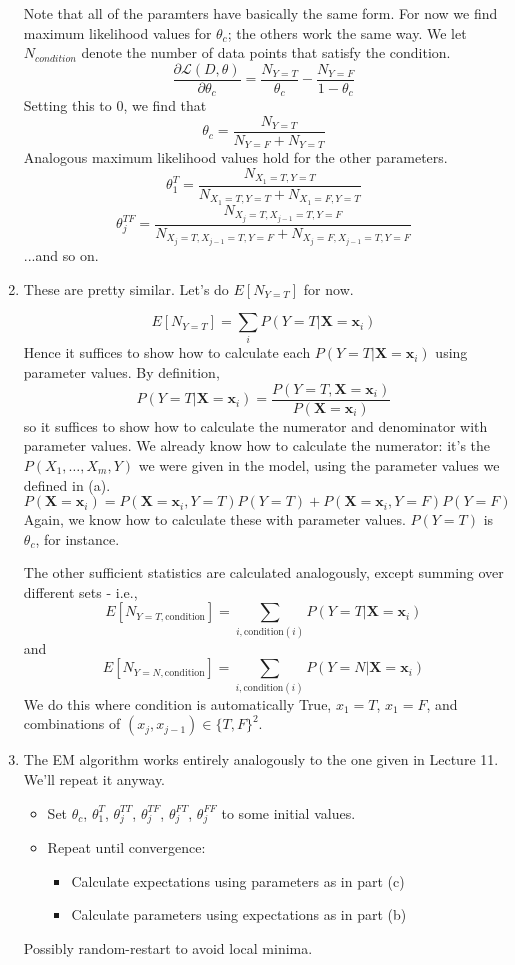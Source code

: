 \documentclass{article}
\newcommand{\dee}[2]{\frac{\partial{#1}}{\partial{#2}}}
\begin{document}
\begin{enumerate}
  Note that all of the paramters have basically the same form. For now
  we find maximum likelihood values for $\theta_c$; the others work the
  same way.  We let $N_{condition}$ denote the number of data points
  that satisfy the condition.
  $$\dee{\mathcal
    L(D,\theta)}{\theta_c}=\frac{N_{Y=T}}{\theta_c}-\frac{N_{Y=F}}{1-\theta_c}$$
  Setting this to 0, we find that
  $$\theta_c=\frac{N_{Y=T}}{N_{Y=F}+N_{Y=T}}$$
  Analogous maximum likelihood values hold for the other parameters.
  $$\theta_1^T=\frac{N_{X_1=T,Y=T}}{N_{X_1=T,Y=T}+N_{X_1=F,Y=T}}$$
  $$\theta_j^{TF}=\frac{N_{X_j=T,X_{j-1}=T,Y=F}}{N_{X_j=T,X_{j-1}=T,Y=F}+N_{X_j=F,X_{j-1}=T,Y=F}}$$
  ...and so on.
\item These are pretty similar. Let's do $E[N_{Y=T}]$ for now.

  $$E[N_{Y=T}]=\sum_i P(Y=T|\mathbf X = \mathbf x_i)$$ Hence it
  suffices to show how to calculate each $P(Y=T|\mathbf X=\mathbf
  x_i)$ using parameter values. By definition,
  \[P(Y=T|\mathbf X = \mathbf x_i)=\frac{P(Y=T, \mathbf X = \mathbf x_i)}{P(\mathbf X = \mathbf x_i)}\]
  so it suffices to show how to calculate the numerator and
  denominator with parameter values. We already know how to calculate
  the numerator: it's the $P(X_1,\ldots,X_m,Y)$ we were given in the
  model, using the parameter values we defined in (a).
  \[P(\mathbf X = \mathbf x_i)=P(\mathbf X = \mathbf x_i, Y=T)P(Y=T)+P(\mathbf X = \mathbf x_i, Y=F)P(Y=F)\]
  Again, we know how to calculate these with parameter
  values. $P(Y=T)$ is $\theta_c$, for instance.

  The other sufficient statistics are calculated analogously, except
  summing over different sets - i.e.,
  \[E[N_{Y=T,\mathrm{condition}}]=\sum_{i, \mathrm{condition}(i)} P(Y=T|\mathbf X=\mathbf x_i)\]
  and
  \[E[N_{Y=N,\mathrm{condition}}]=\sum_{i, \mathrm{condition}(i)} P(Y=N|\mathbf X=\mathbf x_i)\]
  We do this where condition is automatically True, $x_1=T$, $x_1=F$,
  and combinations of $(x_j,x_{j-1})\in \{T,F\}^2$.

\item The EM algorithm works entirely analogously to the one given in
  Lecture 11. We'll repeat it anyway.
  \begin{itemize}
  \item Set $\theta_c$, $\theta^T_1$, $\theta^{TT}_j$, $\theta^{TF}_j$,
    $\theta^{FT}_j$, $\theta^{FF}_j$ to some initial values.
  \item Repeat until convergence:
    \begin{itemize}
    \item Calculate expectations using parameters as in part (c)
    \item Calculate parameters using expectations as in part (b)
    \end{itemize}
  \end{itemize}
  Possibly random-restart to avoid local minima.


\end{enumerate}
\end{document}
